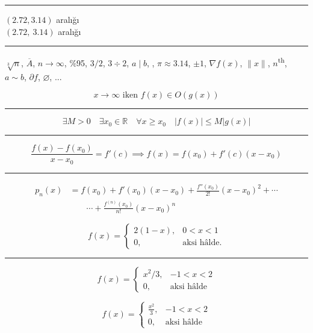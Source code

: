 \documentclass{article}
\let\emptyset\varnothing %
\begin{document}
\bigskip
\hrule
\bigskip

\noindent
$(\num{2,72}, \num{3,14})$ aralığı \\
$(\num{2,72},\: \num{3,14})$ aralığı

\bigskip
\hrule
\bigskip

\noindent
$\sqrt[3]{n}$, $\overline{A}$, $n \to \infty$, \%95, $3/2$, $3 \div 2$, $a \mid b$, , $\pi \approx \num{3,14}$, $\pm 1$, $\nabla f(x)$, $\|x\|$, $n$\textsuperscript{th}, $a \sim b$, $\partial f$, $\emptyset$, ...

\newpage


\[
x \to \infty \text{ iken } f(x) \in O(g(x))
\]

\bigskip
\hrule
\bigskip

\[
\exists M > 0 \quad \exists x_0 \in \mathbb{R} \quad \forall x \geq x_0 \quad |f(x)| \leq M |g(x)|
\]

\bigskip
\hrule
\bigskip

\[
\frac{f(x) - f(x_0)}{x - x_0} = f'(c) \implies f(x) = f(x_0) + f'(c)(x - x_0)
\]

\bigskip
\hrule
\bigskip

\begin{align*} 
p_n(x)
	& = f(x_0) + f'(x_0)(x - x_0) + \frac{f''(x_0)}{2!}(x - x_0)^2 + \cdots \\
	& \qquad \cdots + \frac{f^{(n)}(x_0)}{n!}(x - x_0)^n
\end{align*}

\newpage


\lipsum[1][1-3]
\[
f(x) =
\begin{cases}
2(1 - x),	& 0 < x < 1 \\
0,		& \text{aksi hâlde.} %
\end{cases}
\]
\lipsum[1][4-6]

\bigskip
\hrule
\bigskip

\[
f(x) =
\begin{cases} 
x^2/3,	& -1 < x < 2 \\ 
0,		& \text{aksi hâlde} 
\end{cases}
\]

\[
f(x) =
\begin{cases} 
\frac{x^2}{3},	& -1 < x < 2 \\ 
0,			& \text{aksi hâlde} 
\end{cases}
\]
\end{document}
